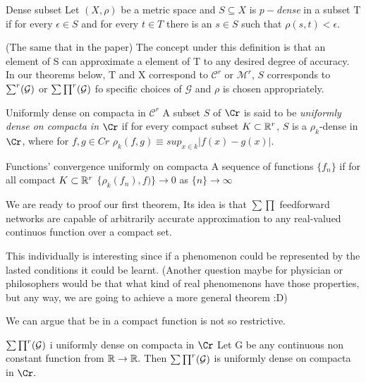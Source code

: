 



\begin{definition} Dense subset  
    Let $(X,\rho)$ be a metric space and $S \subseteq X$ is $p-$\textit{dense} in a subset T
    if for every $\epsilon \in S$ and for every $t \in T$ 
    there is an $s \in S$ such that $\rho (s, t) < \epsilon$. 
\end{definition}  

(The same that in the paper)
The concept under this definition is that an element of S can approximate a element of T to any desired degree of 
accuracy. In our theorems below, T and X correspond to $\mathcal{C}^r$ or $\mathcal{M}^r$, $S$ corresponds to 
$\sum ^r (\mathcal{G})$ or $\sum \prod ^r ( \mathcal{G})$ fo specific choices of $\mathcal G$ and $\rho$ is chosen appropriately.



\begin{definition} Uniformly dense on compacta in $\mathcal{C} ^r$
    A subset $S$ of $\Cr$ is said to be \textit{uniformly dense on compacta in } $\Cr$ if for every compact subset
    $K \subset \mathbb{R}^r$, $S$ is a $\rho_k$-dense in $\Cr$, where for $f,g \in Cr$ 
    $\rho_k(f,g) \equiv sup_{x\in k} |f(x) - g(x)|$. 
\end{definition}

\begin{definition} Functions' convergence uniformly on compacta
    A sequence of functions  $\{f_n\}$  if for all
    compact $K \subset \mathbb{R} ^r$  $\{ \rho_k(f_n), f) \} \rightarrow 0$ as $\{n \} \rightarrow \infty$
\end{definition}



We are ready to proof our first theorem, Its idea 
is that $\sum \prod$ feedforward networks are capable of arbitrarily accurate approximation to 
any real-valued continuos function over a compact set. 

This individually is interesting since if a phenomenon could be represented by the lasted conditions 
it could be learnt. (Another question maybe for physician or philosophers would be
that what kind of real phenomenons have those properties, but any way, 
we are going to achieve a more general theorem :D) 

We can argue that be in a compact function is not so restrictive. 

\begin{theorem} $\sum \prod ^r ( \mathcal{G})$ i uniformly dense on compacta in $\Cr$
 Let G be any continuous non constant function from $\mathbb{R} \rightarrow \mathbb{R}.$ 
 Then $\sum \prod ^r ( \mathcal{G})$ is uniformly dense on compacta in $\Cr .$   
\end{theorem}
